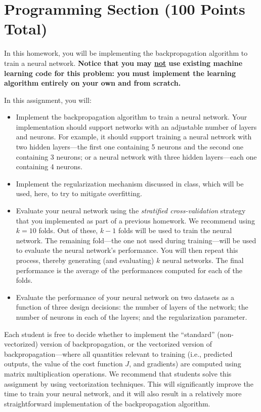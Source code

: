 \documentclass[letterpaper]{article}
\begin{document}
\newpage

\vspace{1cm}
\section*{Programming Section (100 Points Total)}

In this homework, you will be implementing the backpropagation algorithm to train a neural network. \textbf{Notice that you may \ul{not} use existing machine learning code for this problem: you must implement the learning algorithm entirely on your own and from scratch.} 


In this assignment, you will:

\begin{itemize}
\item Implement the backpropagation algorithm to train a neural network. Your implementation should support networks with an adjustable number of layers and neurons. For example, it should support training a neural network with two hidden layers---the first one containing 5 neurons and the second one containing 3 neurons; or a neural network with three hidden layers---each one containing 4 neurons. 
\item Implement the regularization mechanism discussed in class, which will be used, here, to try to mitigate overfitting. 
\item Evaluate your neural network using the \textit{stratified cross-validation} strategy that you implemented as part of a previous homework. We recommend using $k=10$ folds. Out of these, $k-1$ folds will be used to train the neural network. The remaining fold---the one not used during training---will be used to evaluate the neural network's performance. You will then repeat this process, thereby generating (and evaluating) $k$ neural networks. The final performance is the average of the performances computed for each of the folds.
\item Evaluate the performance of your neural network on two datasets as a function of three design decisions: the number of layers of the network; the number of neurons in each of the layers; and the regularization parameter. 
\end{itemize}

Each student is free to decide whether to implement the ``standard'' (non-vectorized) version of backpropagation, or the vectorized version of backpropagation---where all quantities relevant to training (i.e., predicted outputs, the value of the cost function $J$, and gradients) are computed using matrix multiplication operations. We recommend that students solve this assignment by using vectorization techniques. This will significantly improve the time to train your neural network, and it will also result in a relatively more straightforward implementation of the backpropagation algorithm.
\end{document}
